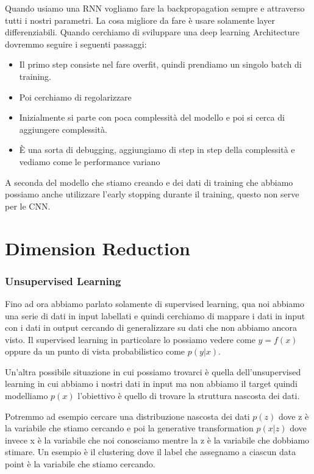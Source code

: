 \documentclass[14pt]{extreport}
\begin{document}
Quando usiamo una RNN vogliamo fare la backpropagation sempre e attraverso tutti i nostri parametri.
La cosa migliore da fare è usare solamente layer differenziabili.
Quando cerchiamo di sviluppare una deep learning Architecture dovremmo seguire i seguenti passaggi:
\begin{itemize}
\item Il primo step consiste nel fare overfit, quindi prendiamo un singolo batch di training.
\item Poi cerchiamo di regolarizzare 
\item Inizialmente si parte con poca complessità del modello e poi si cerca di aggiungere complessità.
\item È una sorta di debugging, aggiungiamo di step in step della complessità e vediamo come le performance variano

\end{itemize}

A seconda del modello che stiamo creando e dei dati di training che abbiamo possiamo anche utilizzare l'early stopping durante il training, questo
non serve per le CNN.


\chapter{Dimension Reduction}

\subsection{Unsupervised Learning}

Fino ad ora abbiamo parlato solamente di supervised learning, qua noi abbiamo una serie di dati in input labellati e quindi cerchiamo di mappare i dati in input
con i dati in output cercando di generalizzare su dati che non abbiamo ancora visto.
Il supervised learning in particolare lo possiamo vedere come $y=f(x)$ oppure da un punto di vista probabilistico come $p(y|x)$.

Un'altra possibile situazione in cui possiamo trovarci è quella dell'unsupervised learning in cui abbiamo i nostri dati in input
ma non abbiamo il target quindi modelliamo $p(x)$ l'obiettivo è quello di trovare la struttura nascosta dei dati.

Potremmo ad esempio cercare una distribuzione nascosta dei dati $p(z)$ dove z è la variabile che stiamo cercando 
e poi la generative transformation $p(x|z)$ dove invece x è la variabile che noi conosciamo mentre la z è la variabile che 
dobbiamo stimare.
Un esempio è il clustering dove il label che assegnamo a ciascun data point è la variabile che stiamo cercando.
\end{document}
